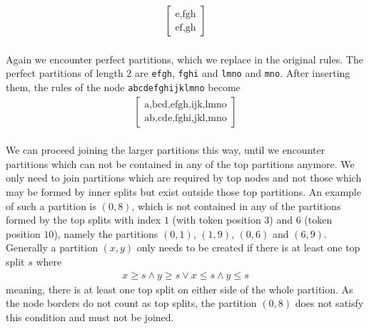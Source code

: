 %
{
    \ttfamily
    \noindent
    \begin{align*}
        \begin{bmatrix}
            \text{e,fgh}\\
            \text{ef,gh}
        \end{bmatrix}
    \end{align*}
}\\
%
Again we encounter perfect partitions, which we replace in the original rules. The perfect partitions of length $2$ are \texttt{efgh}, \texttt{fghi} and \texttt{lmno} and \texttt{mno}. After inserting them, the rules of the node \texttt{abcdefghijklmno} become
%
{
\ttfamily
\begin{align*}
    \begin{bmatrix}
        \text{a,bcd,efgh,ijk,lmno}\\
        \text{ab,cde,fghi,jkl,mno}
    \end{bmatrix}
\end{align*}
}\\
%
We can proceed joining the larger partitions this way, until we encounter partitions which can not be contained in any of the top partitions anymore. We only need to join partitions which are required by top nodes and not those which may be formed by inner splits but exist outside those top partitions. An example of such a partition is $(0,8)$, which is not contained in any of the partitions formed by the top splits with index $1$ (with token position $3$) and $6$ (token position $10$), namely the partitions $(0,1)$, $(1, 9)$, $(0, 6)$ and $(6,9)$. Generally a partition $(x, y)$ only needs to be created if there is at least one top split $s$ where
\begin{align*}
x \geq s \land y \geq s \lor x \leq s \land y \leq s
\end{align*}
meaning, there is at least one top split on either side of the whole partition. As the node borders do not count as top splits, the partition $(0, 8)$ does not satisfy this condition and must not be joined.

